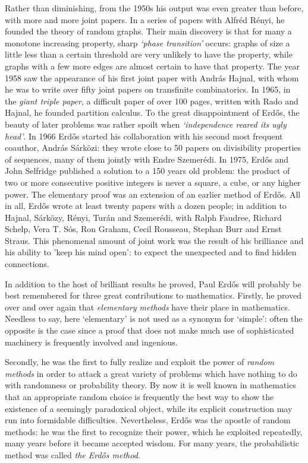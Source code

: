 \documentclass[a6paper]{article}
\begin{document}
Rather than diminishing, from the 1950s his output was even greater than 
before, with more and more joint papers. In a series of papers with 
Alfr\'ed R\'enyi, he founded the theory of random graphs. Their main discovery 
is that for many a monotone increasing property, sharp {\it `phase 
transition'} occurs: graphs of size a little less than a certain threshold
are very unlikely to have the property, while graphs with a few more edges
are almost certain to have that property. The year 1958 saw the appearance of 
his first joint paper with Andr\'as Hajnal, with whom he was to write over 
fifty joint papers on transfinite combinatorics. In 1965, in 
the {\it giant triple paper}, a difficult paper of over 100 pages, 
written with Rado and Hajnal, he founded partition calculus. To the
great disappointment of Erd\H{o}s, the beauty of later problems was rather
spoilt when {\it `independence reared its ugly head'}. In 1966 Erd\H{o}s 
started his collaboration with his second most frequent coauthor, Andr\'as
S\'ark\"ozi: they wrote close to 50 papers on divisibility properties
of sequences, many of them jointly with Endre Szemer\'edi. 
In 1975, Erd\H{o}s and John Selfridge published a solution to a 150 years
old problem: the product of two or more consecutive positive integers 
is never a square, a cube, or any higher power. The elementary proof was 
an extension of an earlier method of Erd\H{o}s.
All in all, 
Erd\H{o}s wrote at least twenty papers with a dozen people; in addition 
to Hajnal, S\'ark\"ozy, R\'enyi, Tur\'an and Szemer\'edi,
with Ralph Faudree, Richard Schelp, Vera T. S\'os,
Ron Graham, Cecil Rousseau, Stephan Burr and Ernst Straus.
This phenomenal amount of joint work was the result of his brilliance 
and his ability to 'keep his mind open': to expect the unexpected and
to find hidden connections.





In addition to the host of brilliant results he proved, Paul Erd\H{o}s will
probably be  best remembered for three great contributions to mathematics.
Firstly, he proved over and over again that {\it elementary methods} have 
their place in mathematics. Needless to say, here `elementary' is not 
used as a synonym for `simple': often the opposite is the case since a 
proof that does not make much use of sophisticated machinery is frequently 
involved and ingenious.


Secondly, he was the first
to fully realize and exploit the power of {\it random methods} in order to
attack a great variety of problems which have nothing to do with randomness or
probability theory.
By now it is well known in mathematics that an appropriate random choice is
frequently the best way to show the existence of a seemingly paradoxical 
object, while its explicit construction may run into formidable difficulties.
Nevertheless, Erd\H{o}s was the apostle of random methods: he was the 
first to recognize their power, which he exploited repeatedly, many years
before it became accepted wisdom. For many years, the probabilistic
method was called {\it the Erd\H{o}s method}.
\end{document}
